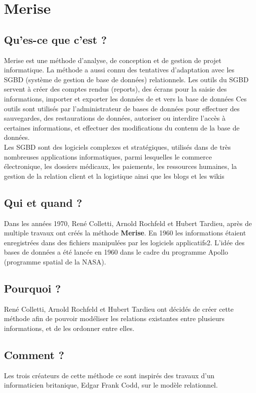 \hypertarget{merise}{%
\section{Merise}\label{merise}}

\hypertarget{ques-ce-que-cest}{%
\subsection{Qu'es-ce que c'est ?}\label{ques-ce-que-cest}}

Merise est une méthode d'analyse, de conception et de gestion de projet
informatique. La méthode a aussi connu des tentatives d'adaptation avec
les SGBD (système de gestion de base de données) relationnels. Les
outils du SGBD servent à créer des comptes rendus (reports), des écrans
pour la saisie des informations, importer et exporter les données de et
vers la base de données Ces outils sont utilisés par l'administrateur de
bases de données pour effectuer des sauvegardes, des restaurations de
données, autoriser ou interdire l'accès à certaines informations, et
effectuer des modifications du contenu de la base de données.\\
Les SGBD sont des logiciels complexes et stratégiques, utilisés dans de
très nombreuses applications informatiques, parmi lesquelles le commerce
électronique, les dossiers médicaux, les paiements, les ressources
humaines, la gestion de la relation client et la logistique ainsi que
les blogs et les wikis

\hypertarget{qui-et-quand}{%
\subsection{Qui et quand ?}\label{qui-et-quand}}

Dans les années 1970, René Colletti, Arnold Rochfeld et Hubert Tardieu,
après de multiple travaux ont créés la méthode \textbf{Merise}. En 1960
les informations étaient enregistrées dans des fichiers manipulées par
les logiciels applicatifs2. L'idée des bases de données a été lancée en
1960 dans le cadre du programme Apollo (programme spatial de la NASA).

\hypertarget{pourquoi}{%
\subsection{Pourquoi ?}\label{pourquoi}}

René Colletti, Arnold Rochfeld et Hubert Tardieu ont décidés de créer
cette méthode afin de pouvoir modéliser les relations existantes entre
plusieurs informations, et de les ordonner entre elles.

\hypertarget{comment}{%
\subsection{Comment ?}\label{comment}}

Les trois créateurs de cette méthode ce sont inspirés des travaux d'un
informaticien britanique, Edgar Frank Codd, sur le modèle relationnel.
